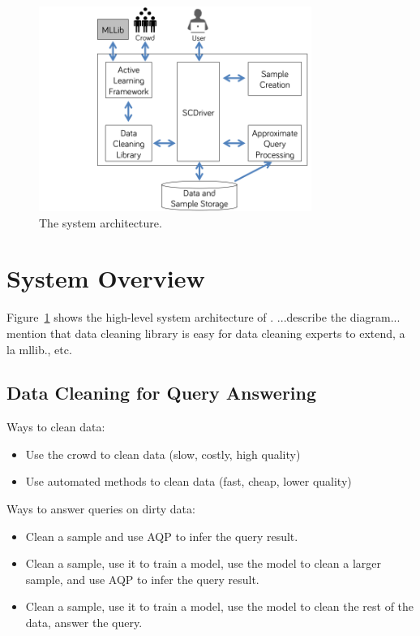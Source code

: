 \begin{figure}[t]
\begin{center}
\includegraphics[width=3.5in]{figures/system-architecture}
\end{center}
\caption{The \system{} system architecture.}
\label{f:system-architecture}
\end{figure}

\section{System Overview}
Figure~\ref{f:system-architecture} shows the high-level system architecture of \system. ...describe the diagram... mention that data cleaning library is easy for data cleaning experts to extend, a la mllib., etc.

\subsection{Data Cleaning for Query Answering}
Ways to clean data:
\begin{itemize}
\item Use the crowd to clean data (slow, costly, high quality)
\item Use automated methods to clean data (fast, cheap, lower quality)
\end{itemize}

Ways to answer queries on dirty data:
\begin{itemize}
\item Clean a sample and use AQP to infer the query result.
\item Clean a sample, use it to train a model, use the model to clean a larger sample, and use AQP to infer the query result.
\item Clean a sample, use it to train a model, use the model to clean the rest of the data, answer the query.
\end{itemize}

